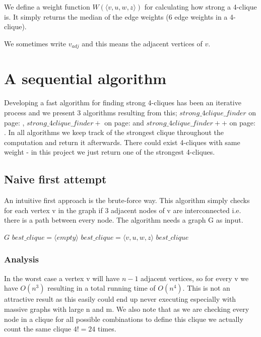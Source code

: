 \documentclass{article}
\begin{document}
We define a weight function $W(\langle v,u,w,z\rangle )$ for calculating how strong a 4-clique is. It simply returns the median of the edge weights (6 edge weights in a 4-clique).

We sometimes write $v_{adj}$ and this means the adjacent vertices of $v$.

\section{A sequential algorithm}
Developing a fast algorithm for finding strong 4-cliques has been an iterative process and we present 3 algorithms resulting from this; $strong\_4clique\_finder$ on page: \pageref{strong_clique}, $strong\_4clique\_finder+$ on page: \pageref{strong_clique_p} and $strong\_4clique\_finder++$ on page: \pageref{strong_clique_pp}. In all algorithms we keep track of the strongest clique throughout the computation and return it afterwards. There could exist 4-cliques with same weight - in this project we just return one of the strongest 4-cliques.

\subsection{Naive first attempt}
An intuitive first approach is the brute-force way. This algorithm simply checks for each vertex v in the graph if 3 adjacent nodes of v are interconnected i.e. there is a path between every node. The algorithm needs a graph G as input.

\begin{algorithm}
\label{strong_clique}
\caption{$strong\_4clique\_finder$}
\begin{algorithmic}
\REQUIRE $G$
\STATE $best\_clique = \langle empty\rangle $
							\STATE $best\_clique = \langle v,u,w,z\rangle $
						\ENDIF
					\ENDIF
				\ENDFOR
			\ENDIF
		\ENDFOR
	\ENDFOR
\ENDFOR
\RETURN $best\_clique$
\end{algorithmic}
\end{algorithm}

\subsubsection{Analysis}
In the worst case a vertex v will have $n-1$ adjacent vertices, so for every v we have $O(n^{3})$ resulting in a total running time of $O(n^{4})$. This is not an attractive result as this easily could end up never executing especially with massive graphs with large n and m. We also note that as we are checking every node in a clique for all possible combinations to define this clique we actually count the same clique $4! = 24$ times.
\end{document}

